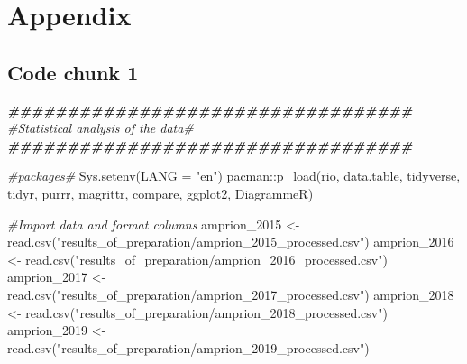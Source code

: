 \documentclass[a4paper,11pt]{article}
\newenvironment{Shaded}{\begin{snugshade}}{\end{snugshade}}
\newcommand{\AttributeTok}[1]{\textcolor[rgb]{0.77,0.63,0.00}{#1}}
\newcommand{\CommentTok}[1]{\textcolor[rgb]{0.56,0.35,0.01}{\textit{#1}}}
\newcommand{\DocumentationTok}[1]{\textcolor[rgb]{0.56,0.35,0.01}{\textbf{\textit{#1}}}}
\newcommand{\FunctionTok}[1]{\textcolor[rgb]{0.00,0.00,0.00}{#1}}
\newcommand{\NormalTok}[1]{#1}
\newcommand{\OtherTok}[1]{\textcolor[rgb]{0.56,0.35,0.01}{#1}}
\newcommand{\SpecialCharTok}[1]{\textcolor[rgb]{0.00,0.00,0.00}{#1}}
\newcommand{\StringTok}[1]{\textcolor[rgb]{0.31,0.60,0.02}{#1}}
\begin{document}
\hypertarget{appendix}{%
\section{Appendix}\label{appendix}}

\hypertarget{code-chunk-1}{%
\subsection{Code chunk 1}\label{code-chunk-1}}
\begin{Shaded}
\begin{Highlighting}[]
\DocumentationTok{\#\#\#\#\#\#\#\#\#\#\#\#\#\#\#\#\#\#\#\#\#\#\#\#\#\#\#\#\#\#\#\#\#\#}
\CommentTok{\#Statistical analysis of the data\#}
\DocumentationTok{\#\#\#\#\#\#\#\#\#\#\#\#\#\#\#\#\#\#\#\#\#\#\#\#\#\#\#\#\#\#\#\#\#\#}

\CommentTok{\#packages\#}
\FunctionTok{Sys.setenv}\NormalTok{(}\AttributeTok{LANG =} \StringTok{"en"}\NormalTok{)}
\NormalTok{pacman}\SpecialCharTok{::}\FunctionTok{p\_load}\NormalTok{(rio, data.table, tidyverse, tidyr, purrr, magrittr, compare, }
\NormalTok{               ggplot2, DiagrammeR)}

\CommentTok{\#Import data and format columns}
\NormalTok{amprion\_2015 }\OtherTok{\textless{}{-}} \FunctionTok{read.csv}\NormalTok{(}\StringTok{"results\_of\_preparation/amprion\_2015\_processed.csv"}\NormalTok{)}
\NormalTok{amprion\_2016 }\OtherTok{\textless{}{-}} \FunctionTok{read.csv}\NormalTok{(}\StringTok{"results\_of\_preparation/amprion\_2016\_processed.csv"}\NormalTok{)}
\NormalTok{amprion\_2017 }\OtherTok{\textless{}{-}} \FunctionTok{read.csv}\NormalTok{(}\StringTok{"results\_of\_preparation/amprion\_2017\_processed.csv"}\NormalTok{)}
\NormalTok{amprion\_2018 }\OtherTok{\textless{}{-}} \FunctionTok{read.csv}\NormalTok{(}\StringTok{"results\_of\_preparation/amprion\_2018\_processed.csv"}\NormalTok{)}
\NormalTok{amprion\_2019 }\OtherTok{\textless{}{-}} \FunctionTok{read.csv}\NormalTok{(}\StringTok{"results\_of\_preparation/amprion\_2019\_processed.csv"}\NormalTok{)}


\end{Highlighting}
\end{Shaded}
\end{document}
